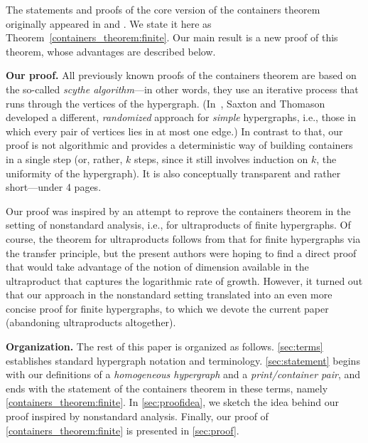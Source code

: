 \documentclass[12pt,reqno]{amsart}
\theoremstyle{plain}
\theoremstyle{definition}
\theoremstyle{remark}
\newcommand{\0}{\mathbb{\emptyset}}
\begin{document}
The statements and proofs of the core version of the containers theorem originally appeared in \cite[Proposition 3.1]{bms} and \cite[Theorem 3.4]{st}. We state it here as Theorem~\ref{containers_theorem:finite}. Our main result is a new proof of this theorem, whose advantages are described below. 

\vspace{0.5em}

\noindent\textbf{Our proof.} All previously known proofs of the containers theorem are based on the so-called \emph{scythe algorithm}---in other words, they use an iterative process that runs through the vertices of the hypergraph. (In~\cite{ST_random}, Saxton and Thomason developed a different, \emph{randomized} approach for \emph{simple} hypergraphs, i.e., those in which every pair of vertices lies in at most one edge.) 
In contrast to that, our proof is not algorithmic and provides a deterministic way of building containers in a single step (or, rather, $k$ steps, since it still involves induction on $k$, the uniformity of the hypergraph). It is also conceptually transparent and rather short---under 4 pages. 

Our proof was inspired by an attempt to reprove the containers theorem in the setting of nonstandard analysis, i.e., for ultraproducts of finite hypergraphs. Of course, the theorem for ultraproducts follows from that for finite hypergraphs via the transfer principle, but the present authors were hoping to find a direct proof that would take advantage of the notion of dimension available in the ultraproduct that captures the logarithmic rate of growth. However, it turned out that our approach in the nonstandard setting translated into an even more concise proof for finite hypergraphs, to which we devote the current paper (abandoning ultraproducts altogether).

\vspace{0.5em}

\noindent\textbf{Organization.} The rest of this paper is organized as follows. \cref{sec:terms} establishes standard hypergraph notation and terminology. \cref{sec:statement} begins with our definitions of a \emph{homogeneous hypergraph} and a \emph{print/container pair}, and ends with the statement of the containers theorem in these terms, namely \cref{containers_theorem:finite}. In \cref{sec:proofidea}, we sketch the idea behind our proof inspired by nonstandard analysis. Finally, our proof of \cref{containers_theorem:finite} is presented in \cref{sec:proof}.
\end{document}
